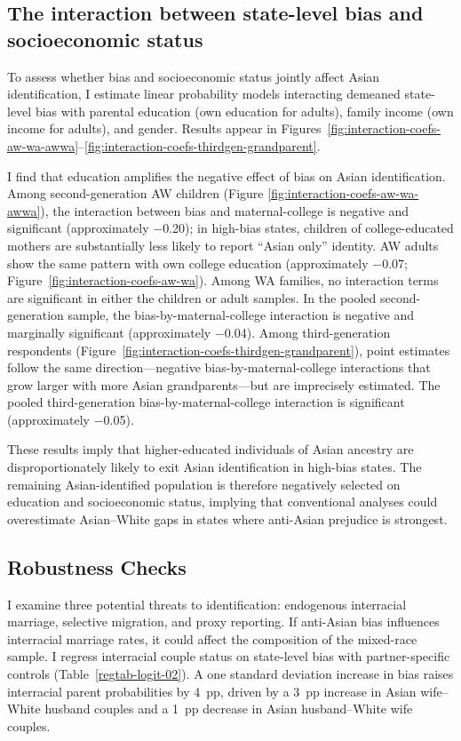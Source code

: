\subsection*{The interaction between state-level bias and socioeconomic status}

To assess whether bias and socioeconomic status jointly affect Asian identification, I estimate linear probability models interacting demeaned state-level bias with parental education (own education for adults), family income (own income for adults), and gender. Results appear in Figures~\ref{fig:interaction-coefs-aw-wa-awwa}--\ref{fig:interaction-coefs-thirdgen-grandparent}.
 
I find that education amplifies the negative effect of bias on Asian identification. Among second-generation AW children (Figure \ref{fig:interaction-coefs-aw-wa-awwa}), the interaction between bias and maternal-college is negative and significant (approximately $-$0.20); in high-bias states, children of college-educated mothers are substantially less likely to report ``Asian only'' identity. AW adults show the same pattern with own college education (approximately $-$0.07; Figure~\ref{fig:interaction-coefs-aw-wa}). Among WA families, no interaction terms are significant in either the children or adult samples. In the pooled second-generation sample, the bias-by-maternal-college interaction is negative and marginally significant (approximately $-$0.04). Among third-generation respondents (Figure~\ref{fig:interaction-coefs-thirdgen-grandparent}), point estimates follow the same direction---negative bias-by-maternal-college interactions that grow larger with more Asian grandparents---but are imprecisely estimated. The pooled third-generation bias-by-maternal-college interaction is significant (approximately $-$0.05).
 
These results imply that higher-educated individuals of Asian ancestry are disproportionately likely to exit Asian identification in high-bias states. The remaining Asian-identified population is therefore negatively selected on education and socioeconomic status, implying that conventional analyses could overestimate Asian--White gaps in states where anti-Asian prejudice is strongest.

\subsection{Robustness Checks}\label{sec:robcheck}

I examine three potential threats to identification: endogenous interracial marriage, selective migration, and proxy reporting. If anti-Asian bias influences interracial marriage rates, it could affect the composition of the mixed-race sample. I regress interracial couple status on state-level bias with partner-specific controls (Table~\ref{regtab-logit-02}). A one standard deviation increase in bias raises interracial parent probabilities by 4~pp, driven by a 3~pp increase in Asian wife--White husband couples and a 1~pp decrease in Asian husband--White wife couples.

